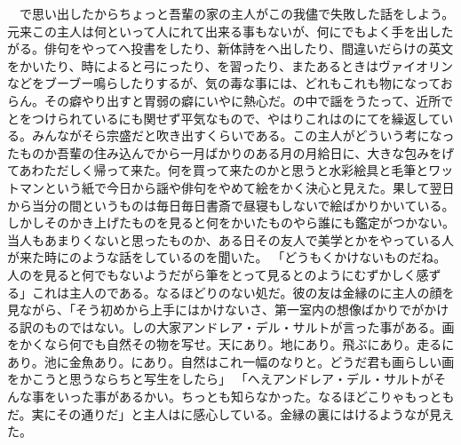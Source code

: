 \documentclass[a5j]{ltjbook}
\begin{document}
　で思い出したからちょっと吾輩の家の主人がこの我儘で失敗した話をしよう。元来この主人は何といって人にれて出来る事もないが、何にでもよく手を出したがる。俳句をやってへ投書をしたり、新体詩をへ出したり、間違いだらけの英文をかいたり、時によると弓にったり、を習ったり、またあるときはヴァイオリンなどをブーブー鳴らしたりするが、気の毒な事には、どれもこれも物になっておらん。その癖やり出すと胃弱の癖にいやに熱心だ。の中で謡をうたって、近所でとをつけられているにも関せず平気なもので、やはりこれはのにてを繰返している。みんながそら宗盛だと吹き出すくらいである。この主人がどういう考になったものか吾輩の住み込んでから一月ばかりのある月の月給日に、大きな包みをげてあわただしく帰って来た。何を買って来たのかと思うと水彩絵具と毛筆とワットマンという紙で今日から謡や俳句をやめて絵をかく決心と見えた。果して翌日から当分の間というものは毎日毎日書斎で昼寝もしないで絵ばかりかいている。しかしそのかき上げたものを見ると何をかいたものやら誰にも鑑定がつかない。当人もあまりくないと思ったものか、ある日その友人で美学とかをやっている人が来た時にのような話をしているのを聞いた。 \newline
「どうもくかけないものだね。人のを見ると何でもないようだがら筆をとって見るとのようにむずかしく感ずる」これは主人のである。なるほどりのない処だ。彼の友は金縁のに主人の顔を見ながら、「そう初めから上手にはかけないさ、第一室内の想像ばかりでがかける訳のものではない。しの大家アンドレア・デル・サルトが言った事がある。画をかくなら何でも自然その物を写せ。天にあり。地にあり。飛ぶにあり。走るにあり。池に金魚あり。にあり。自然はこれ一幅のなりと。どうだ君も画らしい画をかこうと思うならちと写生をしたら」 \newline
「へえアンドレア・デル・サルトがそんな事をいった事があるかい。ちっとも知らなかった。なるほどこりゃもっともだ。実にその通りだ」と主人はに感心している。金縁の裏にはけるようなが見えた。 \newline
\end{document}
